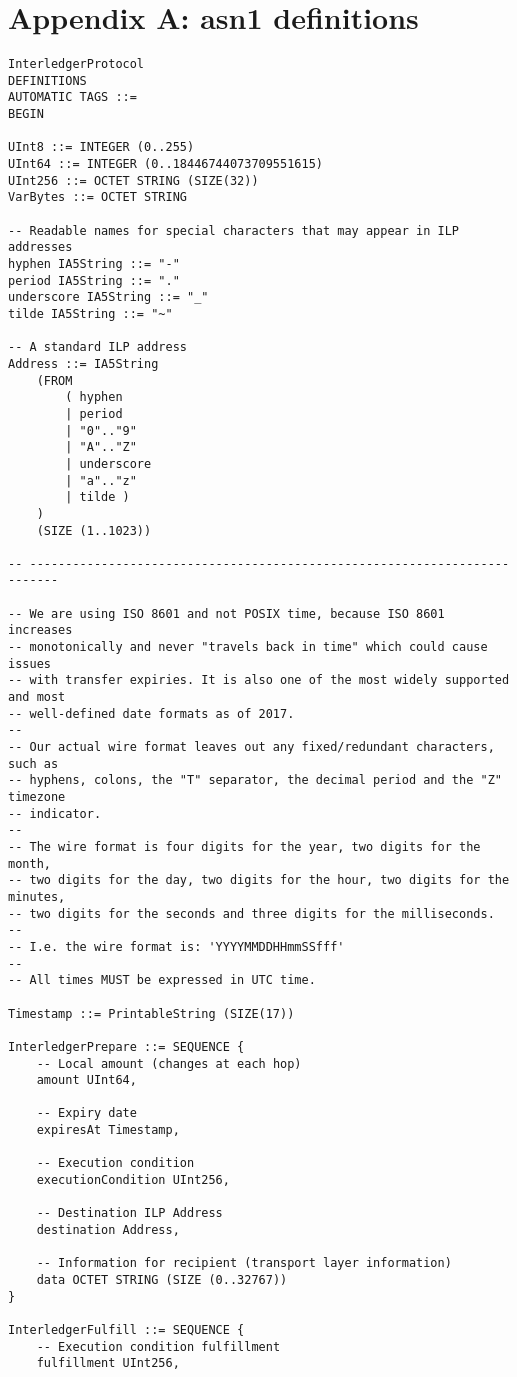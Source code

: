 \documentclass[11pt,twoside,a4paper]{article}
\begin{document}
\section{Appendix A: asn1 definitions}
\begin{verbatim}
InterledgerProtocol
DEFINITIONS
AUTOMATIC TAGS ::=
BEGIN

UInt8 ::= INTEGER (0..255)
UInt64 ::= INTEGER (0..18446744073709551615)
UInt256 ::= OCTET STRING (SIZE(32))
VarBytes ::= OCTET STRING

-- Readable names for special characters that may appear in ILP addresses
hyphen IA5String ::= "-"
period IA5String ::= "."
underscore IA5String ::= "_"
tilde IA5String ::= "~"

-- A standard ILP address
Address ::= IA5String
    (FROM
        ( hyphen
        | period
        | "0".."9"
        | "A".."Z"
        | underscore
        | "a".."z"
        | tilde )
    )
    (SIZE (1..1023))

-- --------------------------------------------------------------------------

-- We are using ISO 8601 and not POSIX time, because ISO 8601 increases
-- monotonically and never "travels back in time" which could cause issues
-- with transfer expiries. It is also one of the most widely supported and most
-- well-defined date formats as of 2017.
--
-- Our actual wire format leaves out any fixed/redundant characters, such as
-- hyphens, colons, the "T" separator, the decimal period and the "Z" timezone
-- indicator.
--
-- The wire format is four digits for the year, two digits for the month,
-- two digits for the day, two digits for the hour, two digits for the minutes,
-- two digits for the seconds and three digits for the milliseconds.
--
-- I.e. the wire format is: 'YYYYMMDDHHmmSSfff'
--
-- All times MUST be expressed in UTC time.

Timestamp ::= PrintableString (SIZE(17))

InterledgerPrepare ::= SEQUENCE {
    -- Local amount (changes at each hop)
    amount UInt64,

    -- Expiry date
    expiresAt Timestamp,

    -- Execution condition
    executionCondition UInt256,

    -- Destination ILP Address
    destination Address,

    -- Information for recipient (transport layer information)
    data OCTET STRING (SIZE (0..32767))
}

InterledgerFulfill ::= SEQUENCE {
    -- Execution condition fulfillment
    fulfillment UInt256,


\end{verbatim}
\end{document}
